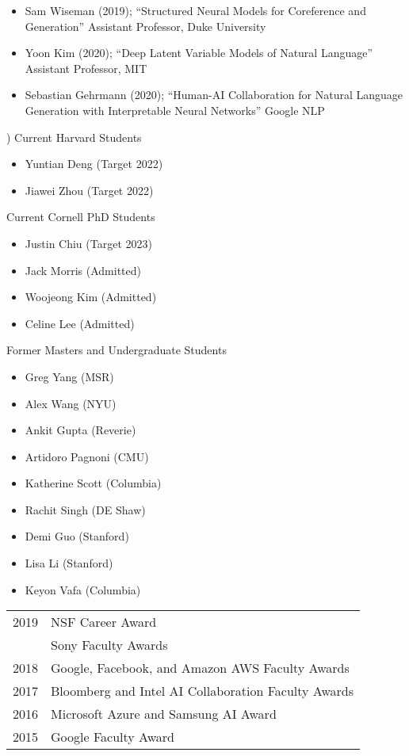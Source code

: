 \documentclass[10pt]{article}
\begin{document}
{\begin{itemize}
\item Sam Wiseman (2019); ``Structured Neural Models for Coreference and Generation'' Assistant Professor, Duke University
\item Yoon Kim (2020); ``Deep Latent Variable Models of Natural Language'' Assistant Professor, MIT
\item Sebastian Gehrmann (2020); ``Human-AI Collaboration for Natural Language Generation with Interpretable Neural Networks'' Google NLP
\end{itemize}

) Current Harvard Students

\begin{itemize}
\item Yuntian Deng (Target 2022)
\item Jiawei Zhou (Target 2022)
\end{itemize}

\ind Current Cornell PhD Students

\begin{itemize}
\item Justin Chiu (Target 2023)
\item Jack Morris (Admitted)
\item Woojeong Kim (Admitted)
\item Celine Lee (Admitted)
\end{itemize}

\ind Former Masters and Undergraduate Students

\begin{itemize}
\item Greg Yang (MSR)
\item Alex Wang (NYU)
\item Ankit Gupta (Reverie)
\item Artidoro Pagnoni (CMU)
\item Katherine Scott (Columbia)
\item Rachit Singh (DE Shaw)
\item Demi Guo (Stanford)
\item Lisa Li (Stanford)
\item Keyon Vafa (Columbia)
\end{itemize}
\bigskip

\medskip

 \begin{tabular}{lp{11.5cm}}
2019 & NSF Career Award \\
& Sony Faculty Awards \\
2018& Google, Facebook, and Amazon AWS Faculty Awards \\
2017 & Bloomberg and Intel AI Collaboration Faculty Awards \\
2016 & Microsoft Azure  and Samsung AI Award \\
2015 & Google Faculty Award \\
\end{tabular}

}
\end{document}
